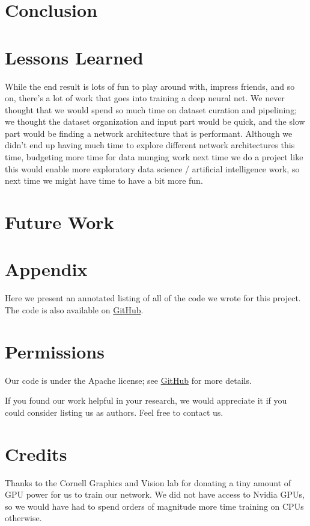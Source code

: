 \documentclass[leqno]{article}
\begin{document}
\section{Conclusion}

\section{Lessons Learned}
While the end result is lots of fun to play around with, impress friends, and so
on, there's a lot of work that goes into training a deep neural net. We never
thought that we would spend so much time on dataset curation and pipelining; we
thought the dataset organization and input part would be quick, and the slow
part would be finding a network architecture that is performant. Although we
didn't end up having much time to explore different network architectures this
time, budgeting more time for data munging work next time we do a project like
this would enable more exploratory data science / artificial intelligence work,
so next time we might have time to have a bit more fun.

\section{Future Work}

\section{Appendix}
Here we present an annotated listing of all of the code we wrote for this
project. The code is also available on \href{http://github.com/darylsew/potato}{GitHub}.

\section{Permissions}
Our code is under the Apache license; see
\href{http://github.com/darylsew/potato}{GitHub} for more details.

If you found our work helpful in your research, we would appreciate it if you could consider
listing us as authors. Feel free to contact us.

\section{Credits}
Thanks to the Cornell Graphics and Vision lab for donating a tiny amount of GPU
power for us to train our network. We did not have access to Nvidia GPUs, so we
would have had to spend orders of magnitude more time training on CPUs
otherwise.
\end{document}
